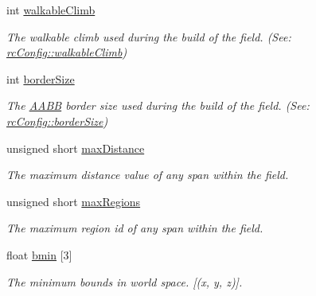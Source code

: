 \begin{DoxyCompactItemize}
int \hyperlink{structrcCompactHeightfield_ae403555331ef3d2624ca9433226bd683}{walkable\+Climb}
\begin{DoxyCompactList}\small\item\em The walkable climb used during the build of the field. (See\+: \hyperlink{structrcConfig_accdba9b8409e8c093ee4ac415a989611}{rc\+Config\+::walkable\+Climb}) \end{DoxyCompactList}\item 
\mbox{\label{structrcCompactHeightfield_a675418d81ce6ade83fbd18be2dfd1647}} 
int \hyperlink{structrcCompactHeightfield_a675418d81ce6ade83fbd18be2dfd1647}{border\+Size}
\begin{DoxyCompactList}\small\item\em The \hyperlink{classAABB}{A\+A\+BB} border size used during the build of the field. (See\+: \hyperlink{structrcConfig_a582bdbc924c92e10b900f2f033e2bd15}{rc\+Config\+::border\+Size}) \end{DoxyCompactList}\item 
\mbox{\label{structrcCompactHeightfield_a38921b347d72bdc07487d07e7608ffc7}} 
unsigned short \hyperlink{structrcCompactHeightfield_a38921b347d72bdc07487d07e7608ffc7}{max\+Distance}
\begin{DoxyCompactList}\small\item\em The maximum distance value of any span within the field. \end{DoxyCompactList}\item 
\mbox{\label{structrcCompactHeightfield_a6bfb7a2fdb06a64b03f0fffa885edd94}} 
unsigned short \hyperlink{structrcCompactHeightfield_a6bfb7a2fdb06a64b03f0fffa885edd94}{max\+Regions}
\begin{DoxyCompactList}\small\item\em The maximum region id of any span within the field. \end{DoxyCompactList}\item 
\mbox{\label{structrcCompactHeightfield_adcaf82c92952cb81cf899f232a1588b2}} 
float \hyperlink{structrcCompactHeightfield_adcaf82c92952cb81cf899f232a1588b2}{bmin} \mbox{[}3\mbox{]}
\begin{DoxyCompactList}\small\item\em The minimum bounds in world space. \mbox{[}(x, y, z)\mbox{]}. \end{DoxyCompactList}\item 

\end{DoxyCompactItemize}
